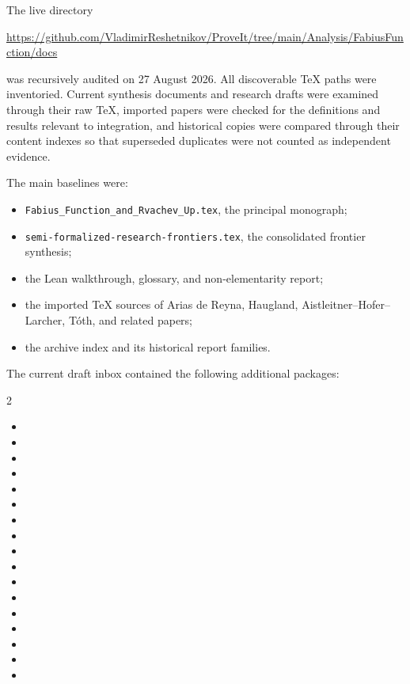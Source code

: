 \documentclass[11pt,oneside]{article}
\theoremstyle{definition}
\theoremstyle{remark}
\newcommand{\1}{\mathbf 1}
\begin{document}
The live directory
\begin{center}
\url{https://github.com/VladimirReshetnikov/ProveIt/tree/main/Analysis/FabiusFunction/docs}
\end{center}
was recursively audited on 27 August 2026.  All discoverable TeX paths were inventoried.  Current synthesis documents and research drafts were examined through their raw TeX, imported papers were checked for the definitions and results relevant to integration, and historical copies were compared through their content indexes so that superseded duplicates were not counted as independent evidence.

The main baselines were:
\begin{itemize}
\item \texttt{Fabius\_Function\_and\_Rvachev\_Up.tex}, the principal monograph;
\item \texttt{semi-formalized-research-frontiers.tex}, the consolidated frontier synthesis;
\item the Lean walkthrough, glossary, and non-elementarity report;
\item the imported TeX sources of Arias de Reyna, Haugland, Aistleitner--Hofer--Larcher, T\'oth, and related papers;
\item the archive index and its historical report families.
\end{itemize}

The current draft inbox contained the following additional packages:
\begin{multicols}{2}\small
\begin{itemize}
\item {}
\item {}
\item {}
\item {}
\item {}
\item {}
\item {}
\item {}
\item {}
\item {}
\item {}
\item {}
\item {}
\item {}
\item {}
\item {}
\item {}
\end{itemize}
\end{multicols}
\end{document}
